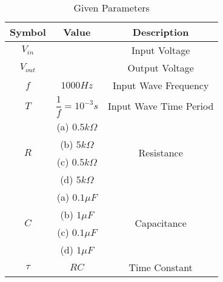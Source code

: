 \begin{table}[!h]
    \centering
    \begin{tabular}{|c|c|c|}
    \hline
       \textbf{Symbol}  & \textbf{Value} &  \textbf{Description}\\
    \hline
       $V_{in}$  &  &  Input Voltage\\
    \hline
        $V_{out}$ & & Output Voltage\\
    \hline
        $f$ & $1000Hz$ & Input Wave Frequency\\
    \hline
        $T$ & $\dfrac{1}{f} = 10^{-3} s$ & Input Wave Time Period\\
    \hline
        \multirow{4}{*}{$R$} & (a) $0.5k\Omega$ & \multirow{4}{*}{Resistance}\\
        \cline{2-2}
        & (b) $5k\Omega$ &\\
        \cline{2-2}
        & (c) $0.5k\Omega$ &\\
        \cline{2-2}
        & (d) $5k\Omega$ &\\
    \hline
        \multirow{4}{*}{$C$} & (a) $0.1\mu F$ & \multirow{4}{*}{Capacitance}\\
        \cline{2-2}
        & (b) $1\mu F$ &\\
        \cline{2-2}
        & (c) $0.1\mu F$ &\\
        \cline{2-2}
        & (d) $1\mu F$ &\\
    \hline
        $\tau$ & $RC$ & Time Constant\\
    \hline
    \end{tabular}
    \caption{Given Parameters}
    \label{tab:1_gate.23.ph.37}
\end{table}
